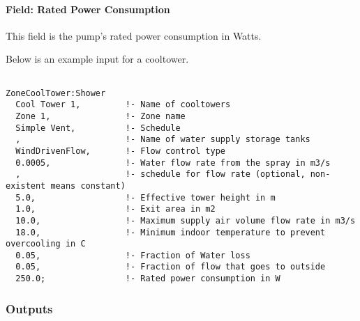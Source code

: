 \paragraph{Field: Rated Power Consumption}\label{field-rated-power-consumption}

This field is the pump's rated power consumption in Watts.

Below is an example input for a cooltower.

\begin{lstlisting}

ZoneCoolTower:Shower
  Cool Tower 1,         !- Name of cooltowers
  Zone 1,               !- Zone name
  Simple Vent,          !- Schedule
  ,                     !- Name of water supply storage tanks
  WindDrivenFlow,       !- Flow control type
  0.0005,               !- Water flow rate from the spray in m3/s
  ,                     !- schedule for flow rate (optional, non-existent means constant)
  5.0,                  !- Effective tower height in m
  1.0,                  !- Exit area in m2
  10.0,                 !- Maximum supply air volume flow rate in m3/s
  18.0,                 !- Minimum indoor temperature to prevent overcooling in C
  0.05,                 !- Fraction of Water loss
  0.05,                 !- Fraction of flow that goes to outside
  250.0;                !- Rated power consumption in W
\end{lstlisting}

\subsubsection{Outputs}\label{outputs-6-000}

